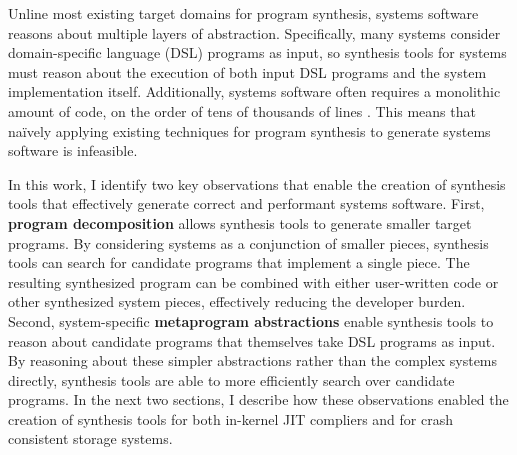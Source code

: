 Unline most existing target domains for program synthesis, systems software reasons
about multiple layers of abstraction.
Specifically, many systems consider domain-specific language (DSL) programs as input,
so synthesis tools for systems must reason about the execution of both input DSL programs
and the system implementation itself.
Additionally, systems software
often requires a monolithic amount of code, on the order of tens of thousands
of lines .
This means that na\"ively applying existing techniques for program synthesis to generate
systems software is infeasible.

In this work, I identify two key observations that enable the creation of synthesis tools
that effectively generate correct and performant systems software.
First, \textbf{program decomposition} allows synthesis tools to generate smaller target programs.
By considering systems as a conjunction of smaller pieces,
synthesis tools can search for candidate programs that implement a single piece.
The resulting synthesized program can be combined with either user-written code or
other synthesized system pieces, effectively reducing the developer burden.
Second, system-specific \textbf{metaprogram abstractions} enable synthesis tools to reason 
about candidate programs that themselves take DSL programs as input.
By reasoning about these simpler abstractions rather than the complex systems directly,
synthesis tools are able to more efficiently search over candidate programs.
In the next two sections, I describe how these observations enabled the creation of
synthesis tools for both in-kernel JIT compliers and for crash consistent storage systems.



